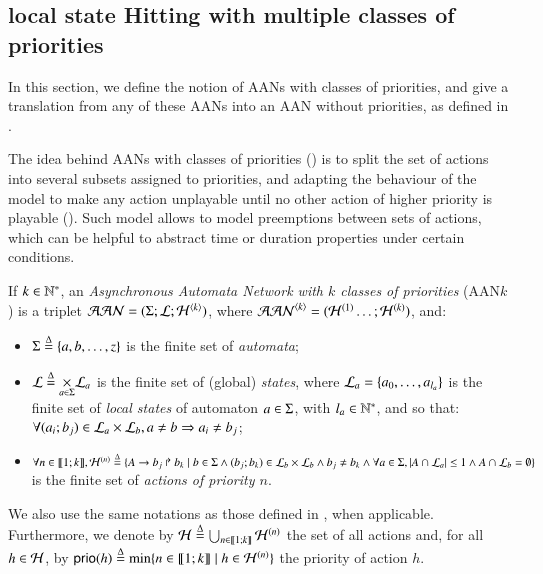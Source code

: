 \subsection{local state Hitting with multiple classes of priorities}
\label{ssec:flattening}

In this section, we define the notion of AANs with classes of priorities,
and give a translation from any of these AANs into
an AAN without priorities, as defined in .

The idea behind AANs with classes of priorities ()
is to split the set of actions into several subsets assigned to priorities,
and adapting the behaviour of the model to make any action unplayable
until no other action of higher priority is playable ().
Such model allows to model preemptions between sets of actions,
which can be helpful to abstract time or duration properties under certain conditions.

\begin{definition}
\label{def:php}
  If $k \in \mathbb{N}^*$,
  an \emph{Asynchronous Automata Network with $k$ classes of priorities} (AAN$k$)
  is a triplet $\mathcal{AAN} = (\Sigma; \mathcal{L}; \mathcal{H}^{{\langle k \rangle}})$,
  where $\mathcal{AAN}^{{\langle k \rangle}} = (\mathcal{H}^{(1)} \dots; \mathcal{H}^{(k)})$,
  and:
  \begin{itemize}
    \item $\Sigma \stackrel{\Delta}= \{a, b, \dots, z\}$ is the finite set of \emph{automata};
    \item $\mathcal{L} \stackrel{\Delta}= \underset{a \in \Sigma}{\times} \mathcal{L}_a$ is the finite set of
      (global) \emph{states},
      where $\mathcal{L}_a = \{a_0, \ldots, a_{l_a}\}$ is the finite set of \emph{local states}
      of automaton $a \in \Sigma$, with $l_a \in \mathbb{N}^*$,
      and so that:
      $\forall (a_i; b_j) \in \mathcal{L}_a \times \mathcal{L}_b, a \neq b \Rightarrow a_i \neq b_j$;
    \item $\forall n \in \llbracket 1; k \rrbracket,
      \mathcal{H}^{(n)} \stackrel{\Delta}= \{A\rightarrow b_j\Rsh b_k \mid
      b \in \Sigma \wedge (b_j; b_k) \in \mathcal{L}_b \times \mathcal{L}_b \wedge
      b_j \neq b_k \wedge
      \forall a \in \Sigma, |A \cap \mathcal{L}_a| \leq 1 \wedge
      A \cap \mathcal{L}_b = \emptyset \}$ is the finite set of \emph{actions of priority $n$}.
  \end{itemize}
  We also use the same notations as those defined in , when applicable.
  Furthermore,
  we denote by $\mathcal{H} \stackrel{\Delta}= \bigcup_{n \in \llbracket 1; k \rrbracket} \mathcal{H}^{(n)}$ the set of all actions
  and, for all $h \in \mathcal{H}$,
  by $\mathsf{prio}(h) \stackrel{\Delta}= \min\{ n \in \llbracket 1; k \rrbracket \mid h \in \mathcal{H}^{(n)} \}$
  the priority of action $h$.
\end{definition}

